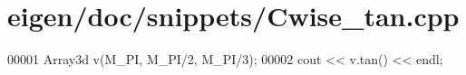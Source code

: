 \hypertarget{eigen_2doc_2snippets_2_cwise__tan_8cpp_source}{}\section{eigen/doc/snippets/\+Cwise\+\_\+tan.cpp}
\label{eigen_2doc_2snippets_2_cwise__tan_8cpp_source}

\begin{DoxyCode}
00001 Array3d v(M\_PI, M\_PI/2, M\_PI/3);
00002 cout << v.tan() << endl;
\end{DoxyCode}
